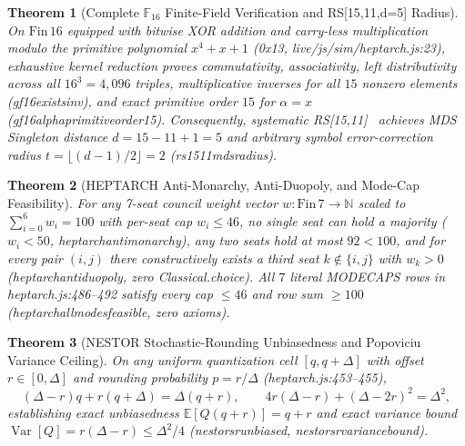 \documentclass[11pt,a4paper]{article}
\numberwithin{equation}{section}
\theoremstyle{plain}
\newtheorem{theorem}{Theorem}[section]
\theoremstyle{definition}
\theoremstyle{remark}
\newcommand{\N}{\mathbb{N}}
\newcommand{\F}{\mathbb{F}}
\newcommand{\code}[1]{{\ttfamily\footnotesize\def\_{\textunderscore\penalty0\hskip0pt}#1}}
\begin{document}
\begin{theorem}[Complete $\F_{16}$ Finite-Field Verification and \code{RS[15,11,d=5]} Radius]
\label{thm:gf16}
On $\mathrm{Fin}\,16$ equipped with bitwise XOR addition and carry-less multiplication modulo the primitive polynomial $x^4+x+1$ (\code{0x13}, \code{live/js/sim/heptarch.js:23}), exhaustive kernel reduction proves commutativity, associativity, left distributivity across all $16^3 = 4{,}096$ triples, multiplicative inverses for all $15$ nonzero elements (\code{gf16\_exists\_inv}), and exact primitive order $15$ for $\alpha = x$ (\code{gf16\_alpha\_primitive\_order\_15}). Consequently, systematic \code{RS[15,11]}~\cite{ReedSolomon1960} achieves MDS Singleton distance $d = 15 - 11 + 1 = 5$ and arbitrary symbol error-correction radius $t = \lfloor(d-1)/2\rfloor = 2$ (\code{rs15\_11\_mds\_radius}).
\end{theorem}

\begin{theorem}[\code{HEPTARCH} Anti-Monarchy, Anti-Duopoly, and Mode-Cap Feasibility]
\label{thm:heptarch}
For any 7-seat council weight vector $w : \mathrm{Fin}\,7 \to \N$ scaled to $\sum_{i=0}^{6} w_i = 100$ with per-seat cap $w_i \le 46$, no single seat can hold a majority ($w_i < 50$, \code{heptarch\_anti\_monarchy}), any two seats hold at most $92 < 100$, and for every pair $(i, j)$ there constructively exists a third seat $k \notin \{i, j\}$ with $w_k > 0$ (\code{heptarch\_anti\_duopoly}, zero \code{Classical.choice}). All $7$ literal \code{MODE\_CAPS} rows in \code{heptarch.js:486--492} satisfy every cap $\le 46$ and row sum $\ge 100$ (\code{heptarch\_all\_modes\_feasible}, zero axioms).
\end{theorem}

\begin{theorem}[\code{NESTOR} Stochastic-Rounding Unbiasedness and Popoviciu Variance Ceiling]
\label{thm:nestor}
On any uniform quantization cell $[q, q+\Delta]$ with offset $r \in [0, \Delta]$ and rounding probability $p = r/\Delta$ (\code{heptarch.js:453--455}),
\begin{equation}
  (\Delta - r) q + r (q + \Delta) = \Delta(q + r),
  \qquad
  4 r(\Delta - r) + (\Delta - 2r)^2 = \Delta^2,
  \label{eq:nestor}
\end{equation}
establishing exact unbiasedness $\mathbb{E}[Q(q+r)] = q+r$ and exact variance bound $\operatorname{Var}[Q] = r(\Delta-r) \le \Delta^2/4$ (\code{nestor\_sr\_unbiased}, \code{nestor\_sr\_variance\_bound}).
\end{theorem}
\end{document}
